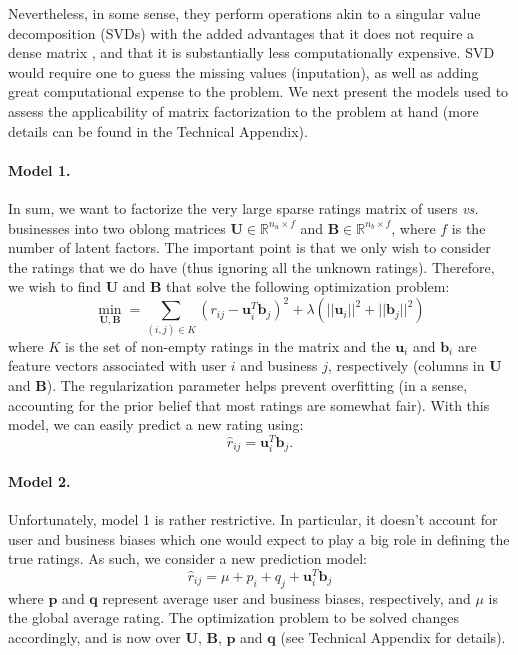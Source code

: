 \documentclass[12pt]{article}
\newcommand{\mbf}[1]{\mathbf{#1}}
\begin{document}
\begin{multicols}{2}
Nevertheless, in some sense, they perform operations akin to a singular value decomposition (SVDs) with the added advantages that it does not require a dense matrix , and that it is substantially less computationally expensive. SVD would require one to guess the missing values (inputation), as well as adding great computational expense to the problem. We next present the models used to assess the applicability of matrix factorization to the problem at hand (more details can be found in the Technical Appendix).

\paragraph{Model 1.} In sum, we want to factorize the very large sparse ratings matrix of users \emph{vs.} businesses into two oblong matrices $\mbf U\in\mathbb{R}^{n_u\times f}$ and $\mbf B\in\mathbb{R}^{n_b\times f}$, where $f$ is the number of latent factors. The important point is that we only wish to consider the ratings that we do have (thus ignoring all the unknown ratings). Therefore, we wish to find $\mbf U$ and $\mbf B$ that solve the following optimization problem:
\begin{equation}
\min_{\mbf U,\mbf B} = \sum_{(i,j)\in K} (r_{ij}-\mbf u_i^T\mbf b_j)^2+\lambda\left(||\mbf u_i||^2+||\mbf b_j||^2\right)
\end{equation}
where $K$ is the set of non-empty ratings in the matrix and the $\mbf u_i$ and $\mbf b_i$ are feature vectors associated with user $i$ and business $j$, respectively (columns in $\mbf U$ and $\mbf B$). The regularization parameter helps prevent overfitting (in a sense, accounting for the prior belief that most ratings are somewhat fair). With this model, we can easily predict a new rating using:
\begin{equation}
\hat r_{ij} = \mbf u_i^T\mbf b_j.
\end{equation}

\paragraph{Model 2.} Unfortunately, model 1 is rather restrictive. In particular, it doesn't account for user and business biases which one would expect to play a big role in defining the true ratings. As such, we consider a new prediction model:
\begin{equation}
\hat r_{ij} = \mu + p_i + q_j + \mbf u_i^T\mbf b_j
\end{equation}
where $\mbf p$ and $\mbf q$ represent average user and business biases, respectively, and $\mu$ is the global average rating. The optimization problem to be solved changes accordingly, and is now over $\mbf U$, $\mbf B$, $\mbf p$ and $\mbf q$ (see Technical Appendix for details).


\end{multicols}
\end{document}
